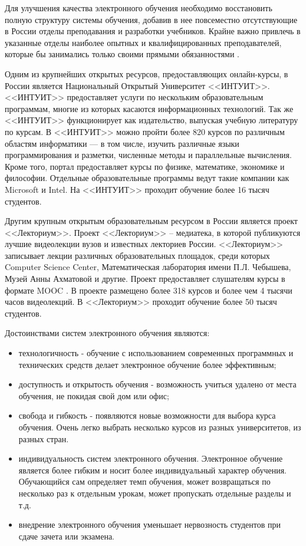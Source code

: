 Для улучшения качества электронного обучения необходимо восстановить полную структуру системы обучения, добавив в нее повсеместно отсутствующие в России отделы преподавания и разработки учебников. Крайне важно привлечь в указанные отделы наиболее опытных и квалифицированных преподавателей, которые бы занимались только своими прямыми обязанностями \cite{levin2005system}. 

Одним из крупнейших открытых ресурсов, предоставляющих онлайн-курсы, в России является Национальный Открытый Университет <<ИНТУИТ>>. <<ИНТУИТ>> предоставляет услуги по нескольким образовательным программам, многие из которых касаются информационных технологий. Так же <<ИНТУИТ>> функционирует как издательство, выпуская учебную литературу по курсам. В <<ИНТУИТ>> можно пройти более 820 курсов по различным областям информатики — в том числе, изучить различные языки программирования и разметки, численные методы и параллельные вычисления. Кроме того, портал предоставляет курсы по физике, математике, экономике и философии. Отдельные образовательные программы ведут такие компании как Microsoft и Intel. На <<ИНТУИТ>> проходит обучение более 16 тысяч студентов.

Другим крупным открытым образовательным ресурсом в России является проект <<Лекториум>>. Проект <<Лекториум>> – медиатека, в которой публикуются лучшие видеолекции вузов и известных лекториев России. <<Лекториум>> записывает лекции различных образовательных площадок, среди которых Computer Science Center, Математическая лаборатория имени П.Л. Чебышева, Музей Анны Ахматовой и другие. Проект предоставляет слушателям курсы в формате MOOC \cite{nilova2014mooc}. В проекте размещено более 318 курсов и более чем 4 тысячи часов видеолекций. В <<Лекториум>> проходит обучение более 50 тысяч студентов. 

Достоинствами систем электронного обучения являются:

\begin{itemize}
\item технологичность - обучение с использованием современных программных и технических средств делает электронное обучение более эффективным; 
\item доступность и открытость обучения - возможность учиться удалено от места обучения, не покидая свой дом или офис; 
\item свобода и гибкость - появляются новые возможности для выбора курса обучения. Очень легко выбрать несколько курсов из разных университетов, из разных стран. 
\item индивидуальность систем электронного обучения. Электронное обучение является более гибким и носит более индивидуальный характер обучения. Обучающийся сам определяет темп обучения, может возвращаться по несколько раз к отдельным урокам, может пропускать отдельные разделы и т.д. 
\item внедрение электронного обучения уменьшает нервозность студентов при сдаче зачета или экзамена. 
\end{itemize}

